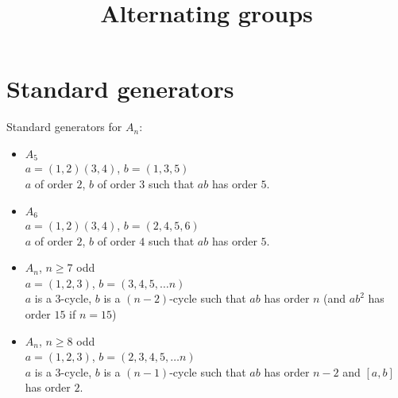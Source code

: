 \documentclass{article}
\title{Alternating groups}
\begin{document}
\maketitle

\section{Standard generators}

Standard generators for $A_n$:

\begin{itemize}
\item $A_5$ \\
$a = (1,2)(3,4)$, $b = (1,3,5)$ \\
$a$ of order $2$, $b$ of order $3$ such that $ab$ has order $5$.
\item $A_6$ \\
$a = (1,2)(3,4)$, $b = (2, 4, 5, 6)$ \\
$a$ of order $2$, $b$ of order $4$ such that $ab$ has order $5$.
\item $A_n$, $n \geq 7$ odd \\
$a = (1, 2, 3)$, $b = (3, 4, 5, \ldots n)$ \\
$a$ is a $3$-cycle, $b$ is a $(n-2)$-cycle such that $ab$ has order $n$ (and $ab^2$ has order $15$ if $n = 15$)
\item $A_n$, $n \geq 8$ odd \\
$a = (1, 2, 3)$, $b = (2, 3, 4, 5, \ldots n)$ \\
$a$ is a $3$-cycle, $b$ is a $(n-1)$-cycle such that $ab$ has order $n-2$ and $[a,b]$ has order $2$.

\end{itemize}
\end{document}
